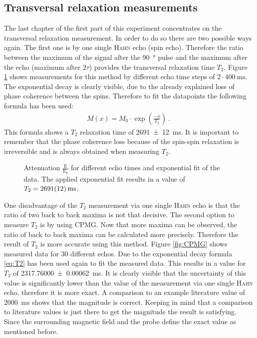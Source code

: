 \subsection{Transversal relaxation measurements}
\label{sec:Transversalrelaxationmeasurements}
The last chapter of the first part of this experiment concentrates on the transversal relaxation measurement.
In order to do so there are two possible ways again.\newline
The first one is by one single \textsc{Hahn} echo (spin echo).
Therefore the ratio between the maximum of the signal after the \SI{90}{\degree} pulse and the maximum after the echo (maximum after $2\tau$) provides the transversal relaxation time $T_2$.
Figure \ref{fig:T2} shows measurements for this method by different echo time steps of $2\cdot \SI{400}{\milli \second}$.
The exponential decay is clearly visible, due to the already explained loss of phase coherence between the spins.
Therefore to fit the datapoints the following formula has been used:
\begin{align}
    M(x)=M_0 \cdot \exp\left(\frac{-x}{T_{2}}\right) \ .
 \label{eq:T2}
\end{align}
This formula shows a $T_2$ relaxation time of \SI{2691 \pm 12}{\milli \second}.
It is important to remember that the phase coherence loss because of the spin-spin relaxation is irreversible and is always obtained when measuring $T_2$.

\begin{figure}[H]
    \centering
    
    \caption[Attenuation $\frac{\text{E}}{\text{E}_0}$ for different echo times and exponential fit of the data.]{Attenuation $\frac{\text{E}}{\text{E}_0}$ for different echo times and exponential fit of the data.
    The applied exponential fit results in a value of $T_2 = \SI{2691 \pm 12}{\milli \second}$.}
    \label{fig:T2}
\end{figure}

One disadvantage of the $T_2$ measurement via one single \textsc{Hahn} echo is that the ratio of two back to back maxima is not that decisive.
The second option to measure $T_2$ is by using CPMG. Now that more maxima can be observed, the ratio of back to back maxima can be calculated more precisely.
Therefore the result of $T_2$ is more accurate using this method.
Figure \ref{fig:CPMG} shows measured data for 30 different echos.
Due to the exponential decay formula \eqref{eq:T2} has been used again to fit the measured data.
This results in a value for $T_2$ of \SI{2317.76000 \pm 0.00062}{\milli \second}.
It is clearly visible that the uncertainty of this value is significantly lower than the value of the measurement via one single \textsc{Hahn} echo, therefore it is more exact.
A comparison to an example literature value of \SI{2000}{\milli \second} \cite{literaturT1} shows that the magnitude is correct.
Keeping in mind that a comparison to literature values is just there to get the magnitude the result is satisfying.
Since the surrounding magnetic field and the probe define the exact value as mentioned before.

